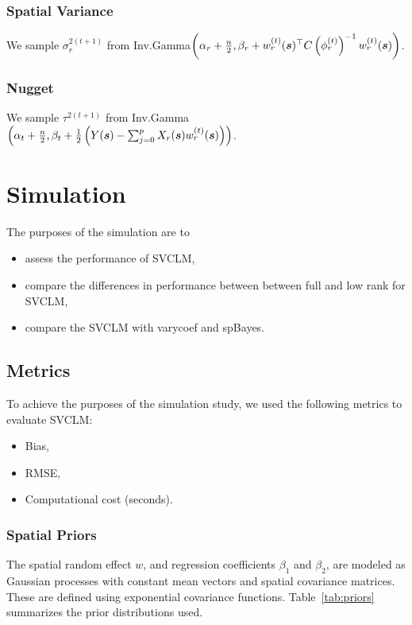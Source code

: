 \subsubsection{Spatial Variance}
\label{sec:spatial_variance}

We sample $\sigma_r^{2(t+1)}$ from Inv.Gamma$\left(\alpha_r + \frac{n}{2}, \beta_r + w_r^{(t)}(\boldsymbol{s})^{\top} C\left(\phi_r^{(t)}\right)^{-1} w_r^{(t)}(\boldsymbol{s})\right)$.

\subsubsection{Nugget}
\label{sec:nugget}

We sample $\tau^{2(t+1)}$ from Inv.Gamma$\left(\alpha_t + \frac{n}{2}, \beta_t + \frac{1}{2} \left(Y(\boldsymbol{s}) - \sum_{j=0}^p X_r(\boldsymbol{s})w_r^{(t)}(\boldsymbol{s}) \right)\right)$.

\section{Simulation}
\label{sec:simulation}
The purposes of the simulation are to 
\begin{itemize}
    \item assess the performance of SVCLM,
    \item compare the differences in performance between between full and low rank for SVCLM,
    \item compare the SVCLM with varycoef and spBayes.
\end{itemize}

\subsection{Metrics}
To achieve the purposes of the simulation study, we used the following metrics to evaluate SVCLM:
\begin{itemize}
    \item Bias,
    \item RMSE,
    \item Computational cost (seconds).
\end{itemize}

\subsubsection{Spatial Priors}

The spatial random effect $ w $, and regression coefficients $ \beta_1 $ and $ \beta_2 $, are modeled as Gaussian processes with constant mean vectors and spatial covariance matrices. These are defined using exponential covariance functions. Table~\ref{tab:priors} summarizes the prior distributions used.

